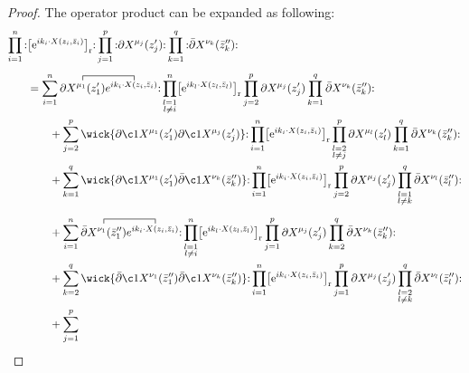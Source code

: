 \begin{tcolorbox}[breakable]
	\begin{proof}
The operator product can be expanded as following:
\begin{align}
	\prod_{i=1}^{n}\normal{&\bigl[\me^{\mi k_i\cdot X(z_i,\bar z_i)}\bigr]_{\mathrm r}}
	\prod_{j=1}^{p}\normal{\partial X^{\mu_j}(z'_j)}
	\prod_{k=1}^{q}\normal{\bar\partial X^{\nu_k}(\bar z''_k)}
	\nonumber\\[4pt]
	&=\sum_{i=1}^{n}
	\contraction{}{\partial X^{\mu_1}(z'_1)}{\,}{e^{\mi k_i\cdot X(z_i,\bar z_i)}}
	\partial X^{\mu_1}(z'_1)e^{\mi k_i\cdot X(z_i,\bar z_i)}
	\normal{
		\prod_{\substack{l=1\\ l\neq i}}^{n}\bigl[\me^{\mi k_l\cdot X(z_l,\bar z_l)}\bigr]_{\mathrm r}
		\prod_{j=2}^{p}\partial X^{\mu_j}(z'_j)
		\prod_{k=1}^{q}\bar\partial X^{\nu_k}(\bar z''_k)}
	\nonumber\\
	&\qquad+\sum_{j=2}^{p}
	\wick{\partial \c1 X^{\mu_1}(z'_1)\partial \c1 X^{\mu_j}(z'_j)}
	\normal{
		\prod_{i=1}^{n}\bigl[\me^{\mi k_i\cdot X(z_i,\bar z_i)}\bigr]_{\mathrm r}
		\prod_{\substack{l=2\\ l\neq j}}^{p}\partial X^{\mu_l}(z'_l)
		\prod_{k=1}^{q}\bar\partial X^{\nu_k}(\bar z''_k)}
	\nonumber\\
	&\qquad+\sum_{k=1}^{q}
	\wick{\partial \c1 X^{\mu_1}(z'_1)\bar\partial \c1 X^{\nu_k}(\bar z''_k)}
	\normal{
		\prod_{i=1}^{n}\bigl[\me^{\mi k_i\cdot X(z_i,\bar z_i)}\bigr]_{\mathrm r}
		\prod_{j=2}^{p}\partial X^{\mu_j}(z'_j)
		\prod_{\substack{l=1\\ l\neq k}}^{q}\bar\partial X^{\nu_l}(\bar z''_l)}
	\nonumber\\[6pt]
	&\qquad+\sum_{i=1}^{n}
	\contraction{}{\bar\partial X^{\nu_1}(\bar z''_1)}{\,}{e^{\mi k_i\cdot X(z_i,\bar z_i)}}
	\bar\partial X^{\nu_1}(\bar z''_1)e^{\mi k_i\cdot X(z_i,\bar z_i)}
	\normal{
		\prod_{\substack{l=1\\ l\neq i}}^{n}\bigl[\me^{\mi k_l\cdot X(z_l,\bar z_l)}\bigr]_{\mathrm r}
		\prod_{j=1}^{p}\partial X^{\mu_j}(z'_j)
		\prod_{k=2}^{q}\bar\partial X^{\nu_k}(\bar z''_k)}
	\nonumber\\
	&\qquad+\sum_{k=2}^{q}
	\wick{\bar\partial \c1 X^{\nu_1}(\bar z''_1)\bar\partial \c1 X^{\nu_k}(\bar z''_k)}
	\normal{
		\prod_{i=1}^{n}\bigl[\me^{\mi k_i\cdot X(z_i,\bar z_i)}\bigr]_{\mathrm r}
		\prod_{j=1}^{p}\partial X^{\mu_j}(z'_j)
		\prod_{\substack{l=2\\ l\neq k}}^{q}\bar\partial X^{\nu_l}(\bar z''_l)}
	\nonumber\\
	&\qquad+\sum_{j=1}^{p}

\end{align}
\end{proof}
\end{tcolorbox}
